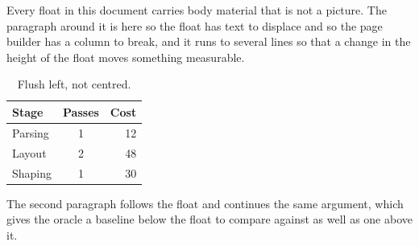 \documentclass{article}
\begin{document}
Every float in this document carries body material that is not a
picture. The paragraph around it is here so the float has text to displace and
so the page builder has a column to break, and it runs to several lines so that
a change in the height of the float moves something measurable.

\begin{table}[h]
\begin{tabular}{|l|c|r|}
\hline
Stage & Passes & Cost \\
\hline
Parsing & 1 & 12 \\
Layout & 2 & 48 \\
Shaping & 1 & 30 \\
\hline
\end{tabular}
\caption{Flush left, not centred.}
\end{table}

The second paragraph follows the float and continues the same
argument, which gives the oracle a baseline below the float to compare against
as well as one above it.
\end{document}
